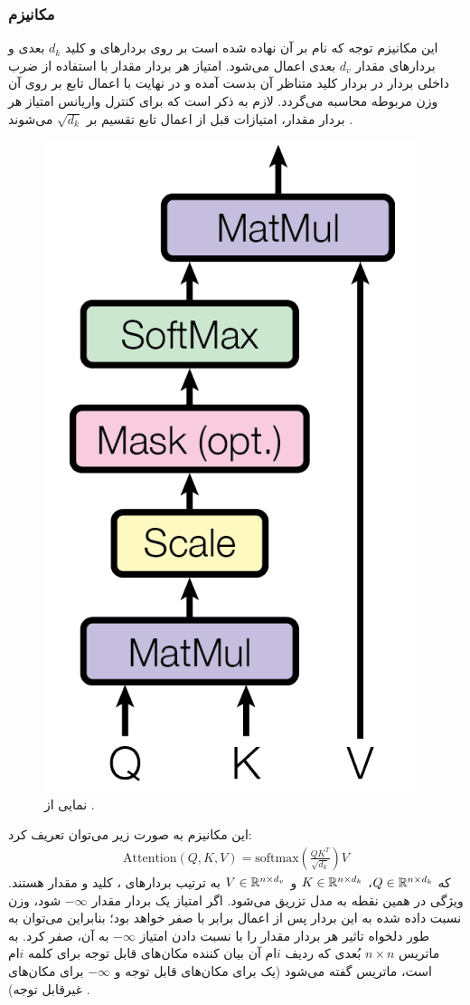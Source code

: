 \subsubsection{مکانیزم
    }
این مکانیزم توجه که نام \dotattention{} بر آن نهاده شده است بر روی بردارهای \query{} و کلید $d_k$ بعدی و بردارهای مقدار $d_v$ بعدی اعمال می‌شود. امتیاز هر بردار مقدار با استفاده از ضرب داخلی بردار \query{} در بردار کلید متناظر آن بدست آمده و در نهایت با اعمال تابع \softmax{} بر روی آن وزن مربوطه محاسبه می‌گردد. لازم به ذکر است که برای کنترل واریانس امتیاز هر بردار مقدار، امتیازات قبل از اعمال تابع \softmax{} تقسیم بر $\sqrt{d_k}$ می‌شوند \cite{transformer}.
\begin{figure}[H]
    \centering
    \includegraphics[width=.25
    \textwidth]{images/attention1.png}
    \caption{نمایی از \dotattention{}
        \cite{transformer}.}
\end{figure}
این مکانیزم به صورت زیر می‌توان تعریف کرد:
\begin{align}
\text{Attention}(Q, K, V) = \text{softmax}(\frac{QK^T}{\sqrt{d_k}})V
\end{align}
که
$Q \in {\mathbb{R}}^{n \times d_k}$،
$K \in {\mathbb{R}}^{n \times d_k}$ و
$V \in {\mathbb{R}}^{n \times d_v}$
به ترتیب بردارهای \query{}، کلید و مقدار هستند.
ویژگی \autoregressive{} در همین نقطه به مدل تزریق می‌شود. اگر امتیاز یک بردار مقدار $-\infty$ شود، وزن نسبت داده شده به این بردار پس از اعمال \softmax{} برابر با صفر خواهد بود؛ بنابراین می‌توان به طور دلخواه تاثیر هر بردار مقدار را با نسبت دادن  امتیاز $-\infty$ به آن، صفر کرد. به ماتریس $n \times n$ بُعدی که ردیف $i$ام آن بیان کننده مکان‌های قابل توجه برای کلمه $i$ام است، ماتریس
گفته می‌شود (یک برای مکان‌های قابل توجه و $-\infty$ برای مکان‌های غیرقابل توجه) \cite{transformer}.

